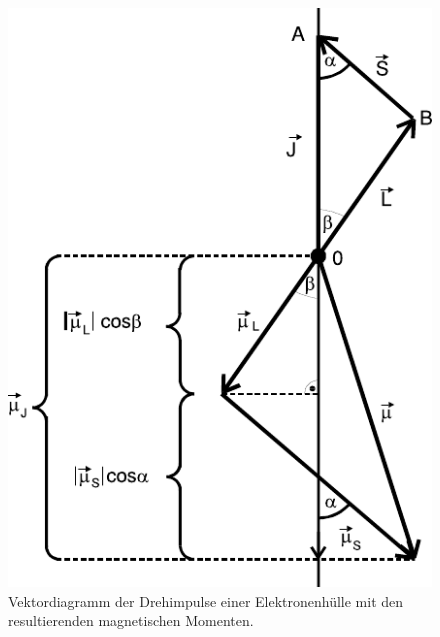 \begin{figure}[H]
	\centering
	\includegraphics{content/grafik/diagramm.pdf}
	\caption{Vektordiagramm der Drehimpulse einer Elektronenhülle mit den resultierenden magnetischen Momenten.}
	\label{fig:diagramm}
\end{figure}

